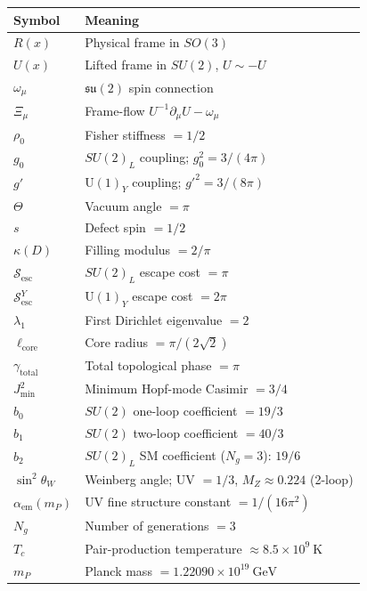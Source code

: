 \documentclass[12pt]{article}
\theoremstyle{definition}
\theoremstyle{remark}
\begin{document}
\begin{center}
\renewcommand{\arraystretch}{1.2}
\begin{tabular}{ll}\toprule
Symbol & Meaning\\\midrule
$R(x)$ & Physical frame in $SO(3)$\\
$U(x)$ & Lifted frame in $SU(2)$, $U\sim -U$\\
$\omega_\mu$ & $\mathfrak{su}(2)$ spin connection\\
$\Xi_\mu$ & Frame-flow $U^{-1}\partial_\mu U-\omega_\mu$\\
$\rho_0$ & Fisher stiffness $=1/2$\\
$g_0$ & $SU(2)_L$ coupling; $g_0^2=3/(4\pi)$\\
$g'$ & $\mathrm{U}(1)_Y$ coupling; $g'^2=3/(8\pi)$\\
$\Theta$ & Vacuum angle $=\pi$\\
$s$ & Defect spin $=1/2$\\
$\kappa(D)$ & Filling modulus $=2/\pi$\\
$\mathcal{S}_{\mathrm{esc}}$ & $SU(2)_L$ escape cost $=\pi$\\
$\mathcal{S}_{\mathrm{esc}}^Y$ & $\mathrm{U}(1)_Y$ escape cost $=2\pi$\\
$\lambda_1$ & First Dirichlet eigenvalue $=2$\\
$\ell_{\mathrm{core}}$ & Core radius $=\pi/(2\sqrt{2})$\\
$\gamma_{\mathrm{total}}$ & Total topological phase $=\pi$\\
$J^2_{\min}$ & Minimum Hopf-mode Casimir $=3/4$\\
$b_0$ & $SU(2)$ one-loop coefficient $=19/3$\\
$b_1$ & $SU(2)$ two-loop coefficient $=40/3$\\
$b_2$ & $SU(2)_L$ SM coefficient ($N_g=3$): $19/6$\\
$\sin^2\theta_W$ & Weinberg angle; UV $=1/3$, $M_Z\approx 0.224$ (2-loop)\\
$\alpha_{\mathrm{em}}(m_P)$ & UV fine structure constant $=1/(16\pi^2)$\\
$N_g$ & Number of generations $=3$\\
$T_c$ & Pair-production temperature $\approx 8.5\times 10^9\ \mathrm{K}$\\
$m_P$ & Planck mass $=1.22090\times 10^{19}\ \mathrm{GeV}$\\\bottomrule
\end{tabular}
\end{center}

\end{document}
